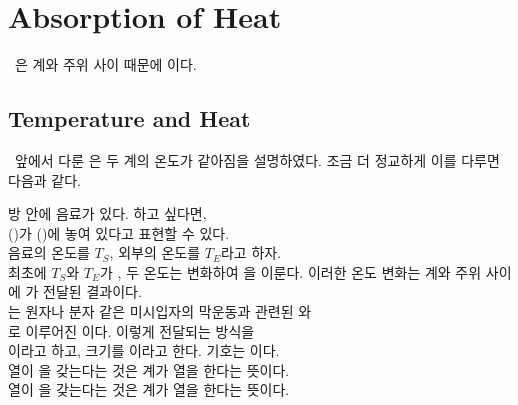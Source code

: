 \section{Absorption of Heat}
%
\ 은 계와 주위 사이  때문에 이다.

\subsection{Temperature and Heat}
%
\ 앞에서 다룬 은 두 계의 온도가 같아짐을 설명하였다.
조금 더 정교하게 이를 다루면 다음과 같다.
\begin{graybox}
\bnset
\bn 방 안에 음료가 있다. 하고 싶다면, \\
\bns {}()가 ()에 놓여 있다고 표현할 수 있다. \\
\bns 음료의 온도를 $T_S$, 외부의 온도를 $T_E$라고 하자. \\
\bn 최초에 $T_S$와 $T_E$가 , 두 온도는 변화하여 을 이룬다.
\bns 이러한 온도 변화는 계와 주위 사이에 가 전달된 결과이다. \\
\bn {}는 원자나 분자 같은 미시입자의 막운동과 관련된 와 \\
\bns {}로 이루어진 이다.
이렇게 전달되는 방식을 \\
\bns {}이라고 하고, 크기를 이라고 한다. 기호는 이다. \\
\bn 열이 을 갖는다는 것은 계가 열을 한다는 뜻이다. \\
\bns 열이 을 갖는다는 것은 계가 열을 한다는 뜻이다. \\
\vspace{-12pt}%
\end{graybox}
